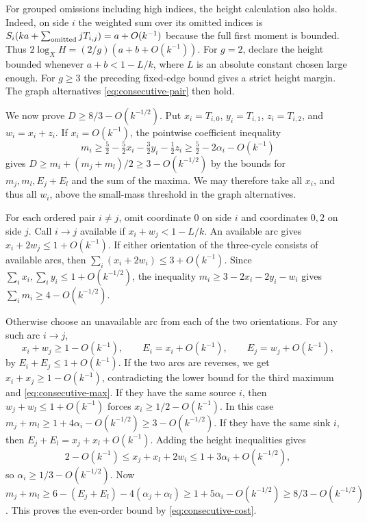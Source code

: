 \documentclass[11pt,reqno]{amsart}
\begin{document}
For grouped omissions including high indices, the height calculation
also holds. Indeed, on side \(i\) the weighted sum over its omitted
indices is \(S_i(ka+\sum_{\rm omitted}jT_{i,j})=a+O(k^{-1})\)
because the full first moment is bounded. Thus
\(2\log_X H=(2/g)(a+b+O(k^{-1}))\).
For \(g=2\), declare the height bounded whenever \(a+b<1-L/k\),
where \(L\) is an absolute constant chosen large enough.
For \(g\ge3\) the preceding fixed-edge bound gives a strict height
margin. The graph alternatives \eqref{eq:consecutive-pair} then hold.

We now prove \(D\ge8/3-O(k^{-1/2})\). Put
\(x_i=T_{i,0}\), \(y_i=T_{i,1}\), \(z_i=T_{i,2}\), and \(w_i=x_i+z_i\).
If \(x_i=O(k^{-1})\), the pointwise coefficient inequality
\[
 m_i\ge\tfrac52-\tfrac52x_i-\tfrac32 y_i-\tfrac12 z_i
       \ge\tfrac52-2\alpha_i-O(k^{-1})
\]
gives \(D\ge m_i+(m_j+m_l)/2\ge3-O(k^{-1/2})\) by the
bounds for \(m_j,m_l,E_j+E_l\) and the sum of the maxima.
We may therefore take all \(x_i\), and thus all \(w_i\), above
the small-mass threshold in the graph alternatives.

For each ordered pair \(i\ne j\), omit coordinate \(0\) on side \(i\)
and coordinates \(0,2\) on side \(j\). Call \(i\to j\) available
if \(x_i+w_j<1-L/k\). An available arc gives
\(x_i+2w_j\le1+O(k^{-1})\). If either orientation of the
three-cycle consists of available arcs, then
\(\sum_i (x_i+2w_i)\le3+O(k^{-1})\). Since
\(\sum_i x_i,\sum_i y_i\le1+O(k^{-1/2})\), the inequality
\(m_i\ge3-2x_i-2y_i-w_i\) gives
\(\sum_i m_i\ge4-O(k^{-1/2})\).

Otherwise choose an unavailable arc from each of the two
orientations. For any such arc \(i\to j\),
\[
 x_i+w_j\ge1-O(k^{-1}),\qquad E_i=x_i+O(k^{-1}),
 \qquad E_j=w_j+O(k^{-1}),
\]
by \(E_i+E_j\le1+O(k^{-1})\). If the two arcs are reverses,
we get \(x_i+x_j\ge1-O(k^{-1})\), contradicting the lower
bound for the third maximum and \eqref{eq:consecutive-max}.
If they have the same source \(i\), then \(w_j+w_l\le1+O(k^{-1})\)
forces \(x_i\ge1/2-O(k^{-1})\). In this case
\(m_j+m_l\ge1+4\alpha_i-O(k^{-1/2})\ge3-O(k^{-1/2})\).
If they have the same sink \(i\), then \(E_j+E_l=x_j+x_l+O(k^{-1})\).
Adding the height inequalities gives
\[
 2-O(k^{-1})\le x_j+x_l+2w_i
 \le 1+3\alpha_i+O(k^{-1/2}),
\]
so \(\alpha_i\ge1/3-O(k^{-1/2})\).
Now \(m_j+m_l\ge6-(E_j+E_l)-4(\alpha_j+\alpha_l)
\ge1+5\alpha_i-O(k^{-1/2})\ge8/3-O(k^{-1/2})\).
This proves the even-order bound by \eqref{eq:consecutive-cost}.
\end{document}
